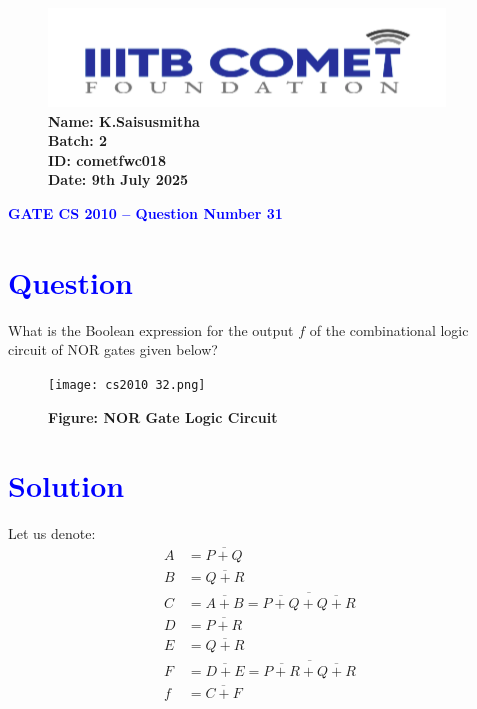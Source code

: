 \documentclass[twocolumn]{article}
\begin{document}
\begin{figure}[t]
    \includegraphics[width=\linewidth]{img3.png} %
        \textbf{Name: K.Saisusmitha} \\
    \textbf{Batch: 2} \\
    \textbf{ID: cometfwc018} \\
    \textbf{Date: 9th July 2025}
\end{figure}

\begin{center}
    {\LARGE \textbf{\textcolor{blue}{GATE CS 2010 – Question Number 31}}}
\end{center}

\vspace{1em}
\section*{\textcolor{blue}{Question}}
What is the Boolean expression for the output $f$ of the combinational logic circuit of NOR gates given below?

\begin{figure}[h]
    \centering
    \texttt{[image: cs2010 32.png]}
        \caption*{\textbf{Figure: NOR Gate Logic Circuit}}
\end{figure}

\section*{\textcolor{blue}{Solution}}

Let us denote:
\begin{align*}
A &= \overline{P + Q} \\
B &= \overline{Q + R} \\
C &= \overline{A + B} = \overline{ \overline{P + Q} + \overline{Q + R} } \\
D &= \overline{P + R} \\
E &= \overline{Q + R} \\
F &= \overline{D + E} = \overline{ \overline{P + R} + \overline{Q + R} } \\
f &= \overline{C + F}
\end{align*}
\end{document}
